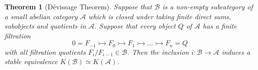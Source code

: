 \documentclass[12pt]{report}
\numberwithin{equation}{section}
\newtheorem{theorem}[dummy]{Theorem}
\newtheorem{definition}[dummy]{Definition}
\begin{document}
	\begin{theorem}[D\'evissage Theorem]
		Suppose that $\mathcal{B}$ is a non-empty subcategory of a small abelian category $\mathcal{A}$ which is closed under taking finite direct sums, subobjects and quotients in $\mathcal{A}$. Suppose that every object $Q$ of $\mathcal{A}$ has a finite filtration
		\[ 0 = F_{-1} \rightarrowtail F_0 \rightarrowtail F_1 \rightarrowtail \dots \rightarrowtail F_n = Q \]
		with all filtration quotients $F_i/F_{i-1} \in \mathcal{B}$. Then the inclusion $i : \mathcal{B} \to \mathcal{A}$ induces a stable equivalence $K(\mathcal{B}) \simeq K(\mathcal{A})$.
	\end{theorem}
%	
%	
%	

	

%	
	
\end{document}
